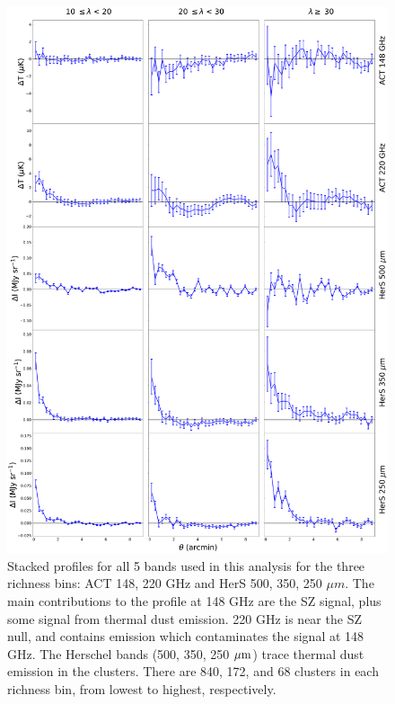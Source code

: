 \documentclass[a4paper,fleqn,usenatbib]{mnras}
\begin{document}
\begin{figure}
  \centering
  \includegraphics[height=0.9 \textheight]{5panel_rawprofs_all_stacks_all_rbin.pdf}

\caption{Stacked profiles for all 5 bands used in this analysis for the three richness bins: ACT 148, 220 GHz and HerS 500, 350, 250 $\mu m$. The main contributions to the profile at 148 GHz are the SZ signal, plus some signal from thermal dust emission. 220 GHz is near the SZ null, and contains emission which contaminates the signal at 148 GHz. The Herschel bands (500, 350, 250 $\rm \mu m$) trace thermal dust emission in the clusters. There are 840, 172, and 68 clusters in each richness bin, from lowest to highest, respectively.}  
  \label{fig:rawstacks}
\end{figure}
\end{document}
